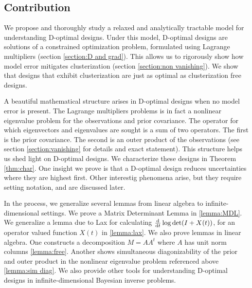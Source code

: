\subsection{Contribution}
We propose and thoroughly study a relaxed and analytically tractable
model for understanding D-optimal designs. Under this model, D-optimal
designs are solutions of a constrained optimization problem,
formulated using Lagrange multipliers (section \ref{section:D and
  grad}). This allows us to rigorously show how model error mitigates
clusterization (section \ref{section:non vanishing}). We show that
designs that exhibit clusterization are just as optimal as
clusterization free designs.

A beautiful mathematical structure arises in D-optimal designs when no
model error is present. The Lagrange multipliers problems is in fact a
nonlinear eigenvalue problem for the observations and prior
covariance. The operator for which eigenvectors and eigenvalues are
sought is a sum of two operators. The first is the prior
covariance. The second is an outer product of the observations (see
section \ref{section:vanishing} for details and exact statement). This
structure helps us shed light on D-optimal designs. We characterize
these designs in Theorem \ref{thm:char}. One insight we prove is that
a D-optimal design reduces uncertainties where they are highest
first. Other interestig phenomena arise, but they require setting
notation, and are discussed later.

In the process, we generalize several lemmas from linear algebra to
infinite-dimensional settings. We prove a Matrix Determinant Lemma in
\ref{lemma:MDL}. We generalize a lemma due to Lax \cite{Lax07} for
calculating $\frac{\text{\textup{d}}}{\text{\textup{d}} t} \log \det (I + X(t))$, for an
operator valued function $X(t)$ in \ref{lemma:lax}. We also prove
lemmas in linear algebra. One constructs a decomposition $M = AA^t$
where $A$ has unit norm columns \ref{lemma:free}. Another shows
simultaneous diagonizability of the prior and outer product in the
nonlinear eigenvalue problem referenced above \ref{lemma:sim diag}. We
also provide other tools for understanding D-optimal designs in
infinite-dimensional Bayesian inverse problems.%

